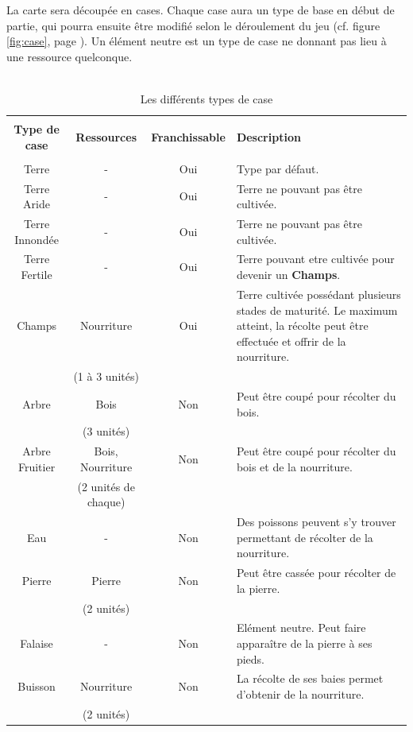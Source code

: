 \documentclass[a4paper]{memoir}
\begin{document}
					La carte sera découpée en cases. Chaque case aura un type de base en début de partie, qui pourra ensuite être modifié selon le déroulement du jeu (cf. figure \ref{fig:case}, page \pageref{fig:case}). Un élément neutre est un type de case ne donnant pas lieu à une ressource quelconque.\\
					\\
					\begin{table}[H]
						\begin{small}
							\begin{tabular}{| c | c | c |p{5cm}|}
								\hline
								&    &    &    \\
								\textbf{Type de case} & \textbf{Ressources} & \textbf{Franchissable} & \textbf{Description}\\
								&    &    &    \\
								\hline
								Terre & - & Oui & Type par défaut.\\
								\hline
								Terre Aride & - & Oui & Terre ne pouvant pas être cultivée.\\
								\hline
								Terre Innondée & - & Oui & Terre ne pouvant pas être cultivée.\\
								\hline
								Terre Fertile & - & Oui & Terre pouvant etre cultivée pour devenir un \textbf{Champs}.\\
								\hline
								Champs & Nourriture & Oui & Terre cultivée possédant plusieurs stades de maturité. Le maximum atteint, la récolte peut être effectuée et offrir de la nourriture.\\
								& (1 à 3 unités) &    &    \\
								\hline
								Arbre & Bois & Non & Peut être coupé pour récolter du bois.\\
								& (3 unités) &    &    \\
								\hline
								Arbre Fruitier & Bois, Nourriture & Non & Peut être coupé pour récolter du bois et de la nourriture.\\
								& (2 unités de chaque) &    &    \\
								\hline
								Eau & - & Non & Des poissons peuvent s'y trouver permettant de récolter de la nourriture.\\
								\hline
								Pierre & Pierre & Non & Peut être cassée pour récolter de la pierre.\\
								& (2 unités) &    &    \\
								\hline
								Falaise & - & Non & Elément neutre. Peut faire apparaître de la pierre à ses pieds.\\
								\hline
								Buisson & Nourriture & Non & La récolte de ses baies permet d'obtenir de la nourriture.\\
								& (2 unités) &    &    \\
								\hline
							\end{tabular}
						\end{small}
						\label{tab:case}
						\caption{Les différents types de case}
					\end{table}
		
\end{document}
